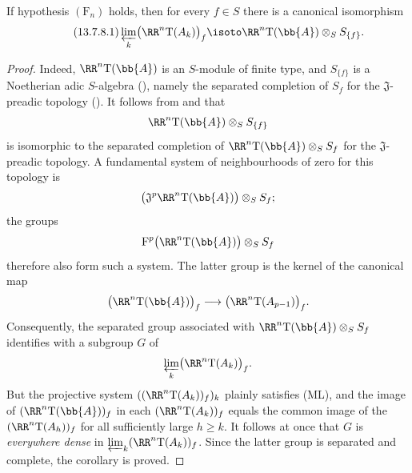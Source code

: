 \begin{corollary}[13.7.8]
\label{0.13.7.8}
If hypothesis $(\mathrm{F}_n)$ holds, then for every $f\in S$ there
is a canonical isomorphism
\begin{equation}
\label{0.13.7.8.1}
\tag{13.7.8.1}
  \varprojlim_k\bigl(\RR^n\mathrm{T}(A_k)\bigr)_f
  \isoto
  \RR^n\mathrm{T}(\bb{A})\otimes_S S_{\{f\}}.
\end{equation}
\end{corollary}

\begin{proof}
Indeed, $\RR^n\mathrm{T}(\bb{A})$ is an $S$-module of finite type,
and $S_{\{f\}}$ is a Noetherian adic $S$-algebra
(), namely the separated
completion of $S_f$ for the $\mathfrak{J}$-preadic topology
().
It follows from  and
 that
\[
  \RR^n\mathrm{T}(\bb{A})\otimes_S S_{\{f\}}
\]
is isomorphic to the separated completion of
$\RR^n\mathrm{T}(\bb{A})\otimes_S S_f$ for the
$\mathfrak{J}$-preadic topology.
A fundamental system of neighbourhoods of zero for this topology
is
\[
  \bigl(
    \mathfrak{J}^p\RR^n\mathrm{T}(\bb{A})
  \bigr)\otimes_S S_f;
\]
the groups
\[
  \mathrm{F}^p\bigl(\RR^n\mathrm{T}(\bb{A})\bigr)
  \otimes_S S_f
\]
therefore also form such a system.
The latter group is the kernel of the canonical map
\[
  \bigl(\RR^n\mathrm{T}(\bb{A})\bigr)_f
  \longrightarrow
  \bigl(\RR^n\mathrm{T}(A_{p-1})\bigr)_f.
\]
Consequently, the separated group associated with
$\RR^n\mathrm{T}(\bb{A})\otimes_S S_f$ identifies with a subgroup
$G$ of
\[
  \varprojlim_k\bigl(\RR^n\mathrm{T}(A_k)\bigr)_f.
\]
But the projective system
$((\RR^n\mathrm{T}(A_k))_f)_k$ plainly satisfies {\rm(ML)}, and the
image of $(\RR^n\mathrm{T}(\bb{A}))_f$ in each
$(\RR^n\mathrm{T}(A_k))_f$ equals the common image of the
$(\RR^n\mathrm{T}(A_h))_f$ for all sufficiently large $h\geq k$.
It follows at once that $G$ is \emph{everywhere dense} in
$\varprojlim_k(\RR^n\mathrm{T}(A_k))_f$.
Since the latter group is separated and complete, the corollary is
proved.
\end{proof}
